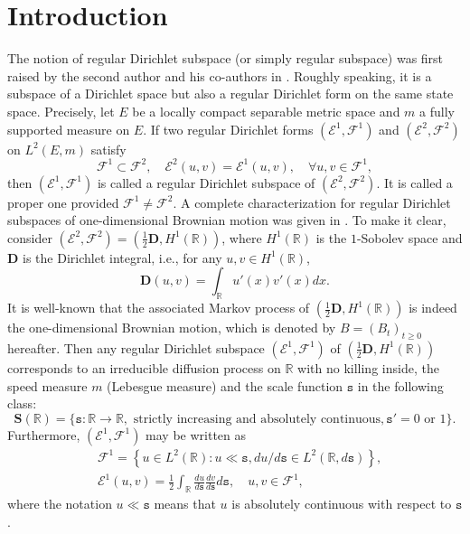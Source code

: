 \documentclass[a4paper]{amsart}
\theoremstyle{definition}
\theoremstyle{remark}
\numberwithin{equation}{section}
\begin{document}
\section{Introduction}\label{SEC1}

The notion of regular Dirichlet subspace (or simply regular subspace) was first raised by the second author and his co-authors in \cite{FFY05}. Roughly speaking, it is a subspace of a Dirichlet space but also a regular Dirichlet form on the same state space. Precisely, let $E$ be a locally compact separable metric space and $m$ a fully supported measure on $E$. If two regular Dirichlet forms $({{\mathcal{E}}}^1,{{\mathcal{F}}}^1)$ and $({{\mathcal{E}}}^2,{{\mathcal{F}}}^2)$ on $L^2(E,m)$ satisfy
\[
	{{\mathcal{F}}}^1\subset {{\mathcal{F}}}^2, \quad {{\mathcal{E}}}^2(u,v)={{\mathcal{E}}}^1(u,v),\quad \forall u,v\in {{\mathcal{F}}}^1,
\]
then $({{\mathcal{E}}}^1,{{\mathcal{F}}}^1)$ is called a regular Dirichlet subspace of $({{\mathcal{E}}}^2,{{\mathcal{F}}}^2)$. It is called a proper one provided ${{\mathcal{F}}}^1\neq {{\mathcal{F}}}^2$. A complete characterization for regular Dirichlet subspaces of one-dimensional Brownian motion was given in \cite{FFY05}. To make it clear, consider $({{\mathcal{E}}}^2,{{\mathcal{F}}}^2)=\left(\frac{1}{2}\mathbf{D}, H^1(\mathbb{R})\right)$, where $H^1(\mathbb{R})$ is the $1$-Sobolev space and $\mathbf{D}$ is the Dirichlet integral, i.e., for any $u,v\in H^1(\mathbb{R})$,
\[
	\mathbf{D}(u,v)=\int_{\mathbb{R}}u'(x)v'(x)dx.
\]
 It is well-known that the associated Markov process of $\left(\frac{1}{2}\mathbf{D}, H^1(\mathbb{R})\right)$ is indeed the one-dimensional Brownian motion, which is denoted by $B=(B_t)_{t\geq 0}$ hereafter. Then any regular Dirichlet subspace  $({{\mathcal{E}}}^1, {{\mathcal{F}}}^1)$ of $(\frac{1}{2}\mathbf{D}, H^1(\mathbb{R}))$ corresponds to an irreducible diffusion process on $\mathbb{R}$ with no killing inside, the speed measure $m$ (Lebesgue measure) and the scale function ${{\mathtt{s}}}$ in the following class:
\begin{equation}\label{EQ1SRS}
\mathbf{S}(\mathbb{R})=\{{{\mathtt{s}}}: \mathbb{R}\rightarrow \mathbb{R}, \text{ strictly increasing and absolutely continuous}, {{\mathtt{s}}}'=0\text{ or }1\}.
\end{equation}
Furthermore, $({{\mathcal{E}}}^1,{{\mathcal{F}}}^1)$ may be written as
\[
\begin{aligned}
	&{{\mathcal{F}}}^1=\left\{u\in L^2(\mathbb{R}): u\ll {{\mathtt{s}}}, du/d{{\mathtt{s}}}\in L^2(\mathbb{R},d{{\mathtt{s}}})\right\}, \\
	&{{\mathcal{E}}}^1(u,v)=\frac{1}{2}\int_\mathbb{R}\frac{du}{d{{\mathtt{s}}}}\frac{dv}{d{{\mathtt{s}}}}d{{\mathtt{s}}},\quad u,v\in {{\mathcal{F}}}^1,
\end{aligned}
\]
where the notation $u\ll {{\mathtt{s}}}$ means that $u$ is absolutely continuous with respect to ${{\mathtt{s}}}$.
\end{document}
